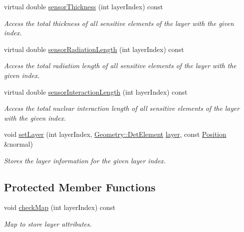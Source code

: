 \begin{DoxyCompactItemize}
virtual double \hyperlink{class_d_d4hep_1_1_d_d_rec_1_1_layering_extension_impl_a1dc384fb9845f9440a044c9b8f08c8be}{sensor\+Thickness} (int layer\+Index) const
\begin{DoxyCompactList}\small\item\em Access the total thickness of all sensitive elements of the layer with the given index. \end{DoxyCompactList}\item 
virtual double \hyperlink{class_d_d4hep_1_1_d_d_rec_1_1_layering_extension_impl_aa36bb3d1c021159a5d46f84ff84c7a11}{sensor\+Radiation\+Length} (int layer\+Index) const
\begin{DoxyCompactList}\small\item\em Access the total radiation length of all sensitive elements of the layer with the given index. \end{DoxyCompactList}\item 
virtual double \hyperlink{class_d_d4hep_1_1_d_d_rec_1_1_layering_extension_impl_ad62fb142713ee5a290b3a7386c3dcd6e}{sensor\+Interaction\+Length} (int layer\+Index) const
\begin{DoxyCompactList}\small\item\em Access the total nuclear interaction length of all sensitive elements of the layer with the given index. \end{DoxyCompactList}\item 
void \hyperlink{class_d_d4hep_1_1_d_d_rec_1_1_layering_extension_impl_a75921469ae3156903c1468cda59ce4cf}{set\+Layer} (int layer\+Index, \hyperlink{class_d_d4hep_1_1_geometry_1_1_det_element}{Geometry\+::\+Det\+Element} \hyperlink{class_d_d4hep_1_1_d_d_rec_1_1_layering_extension_impl_a8bedbd77b80001351451a8cf3bba6a5c}{layer}, const \hyperlink{class_d_d4hep_1_1_d_d_rec_1_1_layering_extension_impl_a34281f7585bbe0d61654c9924e2789e3}{Position} \&normal)
\begin{DoxyCompactList}\small\item\em Stores the layer information for the given layer index. \end{DoxyCompactList}\end{DoxyCompactItemize}
\subsection*{Protected Member Functions}
\begin{DoxyCompactItemize}
\item 
void \hyperlink{class_d_d4hep_1_1_d_d_rec_1_1_layering_extension_impl_a9e627cff66c5e52a883e91c1cb35075e}{check\+Map} (int layer\+Index) const
\begin{DoxyCompactList}\small\item\em Map to store layer attributes. \end{DoxyCompactList}\end{DoxyCompactItemize}
